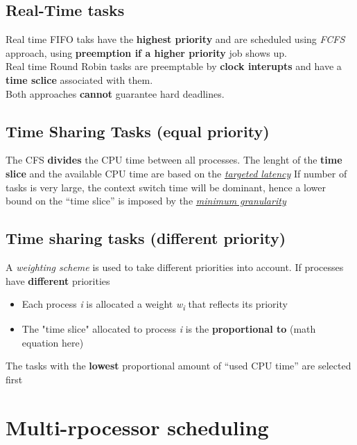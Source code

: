 \documentclass{article}
\newcommand{\worddef}[1]{\hyperref[sec:reference]{\textit{#1}}}
\begin{document}
\subsection{Real-Time tasks}
\begin{flushleft}
Real time FIFO taks have the \textbf{highest priority} and are scheduled using \textit{FCFS} approach, using \textbf{preemption if a higher priority} job shows up.\\
Real time Round Robin tasks are preemptable by \textbf{clock interupts} and have a \textbf{time sclice} associated with them.\\
Both approaches \textbf{cannot} guarantee hard deadlines.
\end{flushleft}

\subsection{Time Sharing Tasks (equal priority)}
\begin{flushleft}
The CFS \textbf{divides} the CPU time between all processes. The lenght of the \textbf{time slice} and the available CPU time are based on the \worddef{targeted latency}
If number of tasks is very large, the context switch time will be dominant, hence a lower bound on the “time slice” is imposed by the \worddef{minimum granularity}
\end{flushleft}

\subsection{Time sharing tasks (different priority)}
\begin{flushleft}
A \textit{weighting scheme} is used to take different priorities into account. If processes have \textbf{different} priorities
\begin{itemize}
	\item Each process \textit{i} is allocated a weight \textit{w\textsubscript{i}} that reflects its priority
	\item The "time slice" allocated to process \textit{i} is the \textbf{proportional to} (math equation here)\\
\end{itemize}
The tasks with the \textbf{lowest} proportional amount of “used CPU time” are selected first
\end{flushleft}

\section{Multi-rpocessor scheduling}
\end{document}
